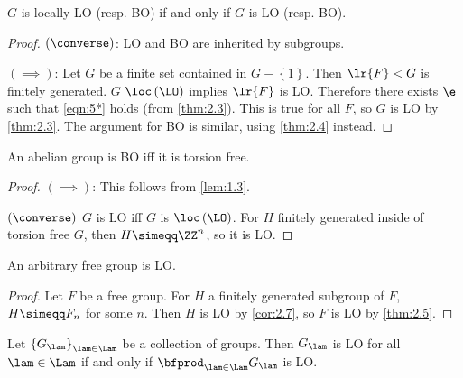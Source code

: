 \begin{thm}
$G$ is locally LO (resp. BO) if and only if $G$ is LO (resp. BO).
\label{thm:2.5}
\end{thm}

\begin{proof}
$\left(\converse\right)$: LO and BO are inherited by subgroups.

$\left(\implies\right)$: Let $G$ be a finite set contained in $G\minus \left\{1\right\}$.
Then $\lr{F} < G$ is finitely generated. 
$G$ $\loc\left(\LO\right)$ implies $\lr{F}$ is LO. Therefore there exists $\e$ such that 
\eqref{eqn:5*} holds (from \cref{thm:2.3}). This is true for all $F$, so $G$ is LO by
\cref{thm:2.3}.
The argument for BO is similar, using \cref{thm:2.4} instead.
\end{proof}

\begin{cor}
An abelian group is BO iff it is torsion free.
\label{cor:2.6}
\end{cor}

\begin{proof}
$\left(\implies\right)$: This follows from \cref{lem:1.3}.

$\left(\converse\right)$ $G$ is LO iff $G$ is $\loc\left(\LO\right)$.
For $H$ finitely generated inside of torsion free $G$, then $H\simeqq \ZZ^n$, so it is LO.
\end{proof}

\begin{cor}
An arbitrary free group is LO.
\label{cor:2.7}
\end{cor}

\begin{proof}
Let $F$ be a free group. For $H$ a finitely generated subgroup of $F$, $H\simeqq F_n$ for
some $n$.
Then $H$ is LO by \cref{cor:2.7}, so $F$ is LO by \cref{thm:2.5}.
\end{proof}

\begin{thm}
Let $\left\{G_\lam\right\}_{\lam\in \Lam}$ be a collection of groups. 
Then $G_\lam$ is LO for all $\lam \in \Lam$ if and only if $\bfprod_{\lam \in \Lam}
G_\lam$ is LO.
\label{thm:2.8}
\end{thm}


